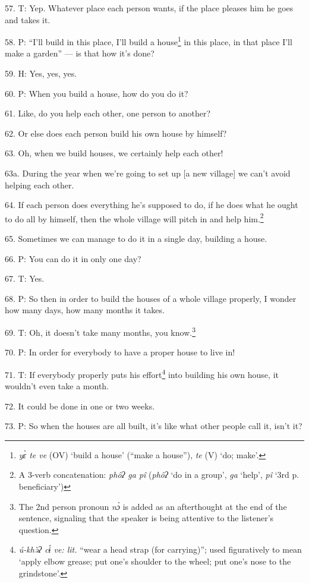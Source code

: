 57. T: Yep. Whatever place each person wants, if the place pleases him he goes
and takes it.

58. P: ``I'll build in this place, I'll build a house\footnote{\textit{yɛ̀ te ve }(OV) `build a house' (``make a house''), \textit{te} (V) `do; make'.} in this place, in that
place I'll make a garden'' --- is that how it's done?

59. H: Yes, yes, yes.

60. P: When you build a house, how do you do it?

61. Like, do you help each other, one person to another?

62. Or else does each person build his own house by himself?

63. Oh, when we build houses, we certainly help each other!

63a. During the year when we're going to set up [a new village] we can't avoid
helping each other.

64. If each person does everything he's supposed to do, if he does what he ought
to do all by himself, then the whole village will pitch in and help him.\footnote{A 3-verb concatenation: \textit{phôʔ ga pî} (\textit{phôʔ} `do in a group', \textit{ga} `help', \textit{pî} `3rd p. beneficiary')}

65. Sometimes we can manage to do it in a single day, building a house.

66. P: You can do it in only one day?

67. T: Yes.

68. P: So then in order to build the houses of a whole village properly, I wonder
how many days, how many months it takes.

69. T: Oh, it doesn't take many months, you know.\footnote{The 2nd person pronoun \textit{nɔ̀} is added as an afterthought at the end of the sentence, signaling that the speaker is being attentive to the listener's question.}

70. P: In order for everybody to have a proper house to live in!

71. T: If everybody properly puts his effort\footnote{\textit{ú-khə̀ʔ cɨ́ ve: lit. }``wear a head strap (for carrying)''; used figuratively to mean `apply elbow grease; put one's shoulder to the wheel; put one's nose to the grindstone'.} into building his own house, it
wouldn't even take a month.

72. It could be done in one or two weeks.

73. P: So when the houses are all built, it's like what other people call it, isn't
it?

